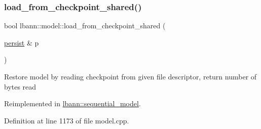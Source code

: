 \subsubsection{\texorpdfstring{load\+\_\+from\+\_\+checkpoint\+\_\+shared()}{load\_from\_checkpoint\_shared()}}
{\footnotesize\ttfamily bool lbann\+::model\+::load\+\_\+from\+\_\+checkpoint\+\_\+shared (\begin{DoxyParamCaption}\item[{\hyperlink{classlbann_1_1persist}{persist} \&}]{p }\end{DoxyParamCaption})\hspace{0.3cm}{\ttfamily [virtual]}}

Restore model by reading checkpoint from given file descriptor, return number of bytes read 

Reimplemented in \hyperlink{classlbann_1_1sequential__model_aa52cca299012c67f88483206d50abb21}{lbann\+::sequential\+\_\+model}.



Definition at line 1173 of file model.\+cpp.


